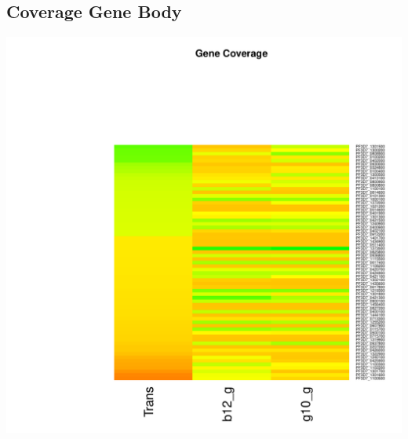 \documentclass{article}\usepackage[]{graphicx}\usepackage[]{color}
\newenvironment{knitrout}{}{} %
\begin{document}
\subsection{Coverage Gene Body}
\begin{knitrout}
\color{fgcolor}

{\centering \includegraphics[width=.9\linewidth]{figure/minimal-heat_cov_gene-1} 

}



\end{knitrout}
\clearpage
\end{document}
